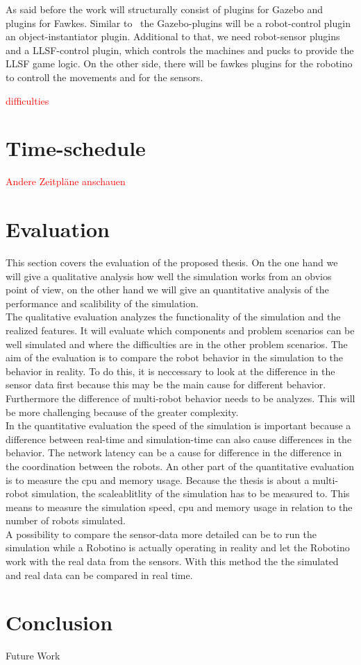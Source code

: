 \documentclass[11pt,a4paper,titlepage]{article}
\begin{document}
As said before the work will structurally consist of plugins for Gazebo and plugins for Fawkes. Similar to~\cite{KlingenDA} the Gazebo-plugins will be a robot-control plugin an object-instantiator plugin. Additional to that, we need robot-sensor plugins and a LLSF-control plugin, which controls the machines and pucks to provide the LLSF game logic. On the other side, there will be fawkes plugins for the robotino to controll the movements and for the sensors.

\textcolor{red}{difficulties} 

\section{Time-schedule}
\textcolor{red}{Andere Zeitpläne anschauen}

\section{Evaluation}
This section covers the evaluation of the proposed thesis. On the one hand we will give a qualitative analysis how well the simulation works from an obvios point of view, on the other hand we will give an quantitative analysis of the performance and scalibility of the simulation.\\
The qualitative evaluation analyzes the functionality of the simulation and the realized features. It will evaluate which components and problem scenarios can be well simulated and where the difficulties are in the other problem scenarios. The aim of the evaluation is to compare the robot behavior in the simulation to the behavior in reality. To do this, it is neccessary to look at the difference in the sensor data first because this may be the main cause for different behavior. Furthermore the difference of multi-robot behavior needs to be analyzes. This will be more challenging because of the greater complexity.\\
In the quantitative evaluation the speed of the simulation is important because a difference between real-time and simulation-time can also cause differences in the behavior. The network latency can be a cause for difference in the difference in the coordination between the robots. An other part of the quantitative evaluation is to measure the cpu and memory usage. Because the thesis is about a multi-robot simulation, the scaleablitlity of the simulation has to be measured to. This means to measure the simulation speed, cpu and memory usage in relation to the number of robots simulated.\\
A possibility to compare the sensor-data more detailed can be to run the simulation while a Robotino is actually operating in reality and let the Robotino work with the real data from the sensors. With this method the the simulated and real data can be compared in real time.


\section{Conclusion}
Future Work



\end{document}
